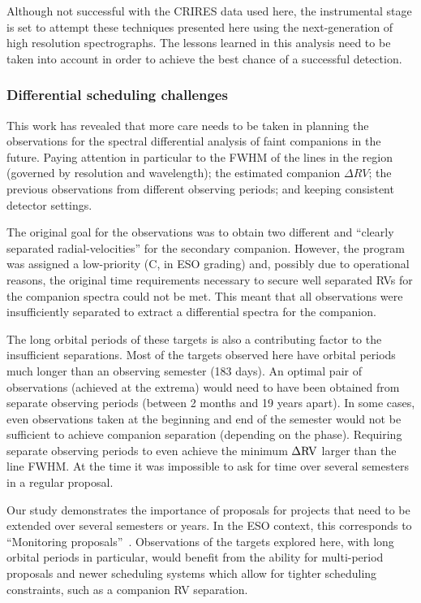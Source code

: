 Although not successful with the CRIRES data used here, the instrumental stage is set to attempt these techniques presented here using the next-generation of high resolution spectrographs.
The lessons learned in this analysis need to be taken into account in order to achieve the best chance of a successful detection.

\subsubsection{Differential scheduling challenges}
\label{subsubsec:differential scedualing}
This work has revealed that more care needs to be taken in planning the observations for the spectral differential analysis of faint companions in the future.
Paying attention in particular to the {FWHM} of the lines in the region (governed by resolution and wavelength); the estimated companion \(\Delta RV\); the previous observations from different observing periods; and keeping consistent detector settings.

The original goal for the observations was to obtain two different and ``clearly separated radial-velocities'' for the secondary companion.
However, the program was assigned a low-priority (C, in {ESO} grading) and, possibly due to operational reasons, the original time requirements necessary to secure well separated {RV}s for the companion spectra could not be met.
This meant that all observations were insufficiently separated to extract a differential spectra for the companion.

The long orbital periods of these targets is also a contributing factor to the insufficient separations.
Most of the targets observed here have orbital periods much longer than an observing semester (183 days).
An optimal pair of observations (achieved at the extrema) would need to have been obtained from separate observing periods (between 2 months and 19 years apart).
In some cases, even observations taken at the beginning and end of the semester would not be sufficient to achieve companion separation (depending on the phase).
Requiring separate observing periods to even achieve the minimum \(\Delta \rm RV\) larger than the line {FWHM}.
At the time it was impossible to ask for time over several semesters in a regular proposal.

Our study demonstrates the importance of proposals for projects that need to be extended over several semesters or years.
In the {ESO} context, this corresponds to ``Monitoring proposals''~\citep[e.g.][pg. 18]{eso_eso_2017}.
Observations of the targets explored here, with long orbital periods in particular, would benefit from the ability for multi-period proposals and newer scheduling systems which allow for tighter scheduling constraints, such as a companion {RV} separation.

